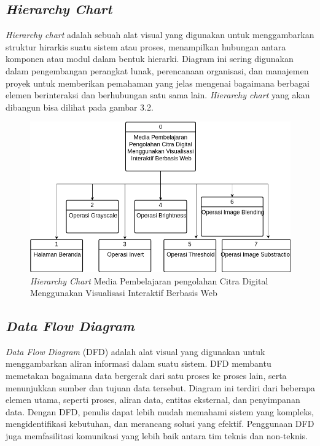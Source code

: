 \subsection{\textit{Hierarchy Chart}}

\textit{Hierarchy chart} adalah sebuah alat visual yang digunakan untuk menggambarkan struktur hirarkis suatu sistem atau proses, menampilkan hubungan antara komponen atau modul dalam bentuk hierarki. Diagram ini sering digunakan dalam pengembangan perangkat lunak, perencanaan organisasi, dan manajemen proyek untuk memberikan pemahaman yang jelas mengenai bagaimana berbagai elemen berinteraksi dan berhubungan satu sama lain. \textit{Hierarchy chart} yang akan dibangun bisa dilihat pada gambar 3.2.

          \begin{figure}[ht]
    	      \includegraphics[width=15cm, center]{images/Hierarchy-Chart.png}
              \caption{\textit{Hierarchy Chart} Media Pembelajaran pengolahan Citra Digital Menggunakan Visualisasi Interaktif Berbasis Web}
          \end{figure}

\subsection{\textit{Data Flow Diagram}}

\textit{Data Flow Diagram} (DFD) adalah alat visual yang digunakan untuk menggambarkan aliran informasi dalam suatu sistem. DFD membantu memetakan bagaimana data bergerak dari satu proses ke proses lain, serta menunjukkan sumber dan tujuan data tersebut. Diagram ini terdiri dari beberapa elemen utama, seperti proses, aliran data, entitas eksternal, dan penyimpanan data. Dengan DFD, penulis dapat lebih mudah memahami sistem yang kompleks, mengidentifikasi kebutuhan, dan merancang solusi yang efektif. Penggunaan DFD juga memfasilitasi komunikasi yang lebih baik antara tim teknis dan non-teknis. 

